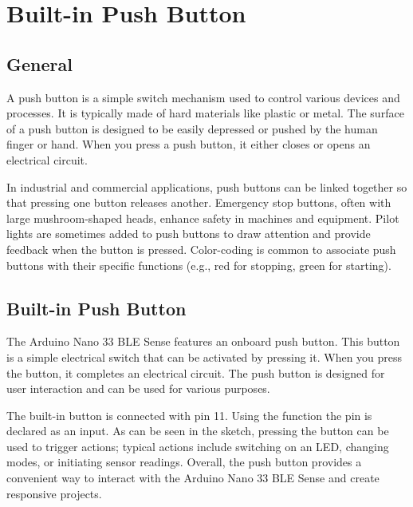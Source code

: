 %
%

\chapter{Built-in Push Button}

\section{General}

A push button is a simple switch mechanism used to control various devices and processes. It is typically made of hard materials like plastic or metal.
The surface of a push button is designed to be easily depressed or pushed by the human finger or hand. When you press a push button, it either closes or opens an electrical circuit. 

In industrial and commercial applications, push buttons can be linked together so that pressing one button releases another. Emergency stop buttons, often with large mushroom-shaped heads, enhance safety in machines and equipment. Pilot lights are sometimes added to push buttons to draw attention and provide feedback when the button is pressed. Color-coding is common to associate push buttons with their specific functions (e.g., red for stopping, green for starting). \cite{DIN:13850}







\section{Built-in Push Button}

The Arduino Nano 33 BLE Sense features an onboard push button. This button is a simple electrical switch that can be activated by pressing it. When you press the button, it completes an electrical circuit. The push button is designed for user interaction and can be used for various purposes.

The built-in button  is connected with pin 11. Using the function  the pin is declared as an input. As can be seen in the sketch, pressing the button can be used to trigger actions; typical actions include switching on an LED, changing modes, or initiating sensor readings.
Overall, the push button provides a convenient way to interact with the Arduino Nano 33 BLE Sense and create responsive projects. \cite{Arduino:2023a,Arduino:2023,ArduinoNano33Manual:2022}


